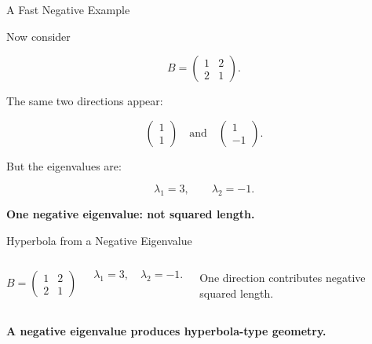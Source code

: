 \documentclass[10pt]{beamer}
\theoremstyle{definition}
\newcommand{\x}[1]{\alert{\textbf{#1}}}
\begin{document}
\begin{frame}{A Fast Negative Example}

Now consider

$$
B=\begin{pmatrix}1&2\\2&1\end{pmatrix}.
$$

\vfill

The same two directions appear:

$$
\begin{pmatrix}1\\1\end{pmatrix}
\quad\text{and}\quad
\begin{pmatrix}1\\-1\end{pmatrix}.
$$

\vfill

But the eigenvalues are:

$$
\lambda_1=3,\qquad \lambda_2=-1.
$$

\vfill

\begin{center}
\x{One negative eigenvalue: not squared length.}
\end{center}

\end{frame}


\begin{frame}[fragile]{Hyperbola from a Negative Eigenvalue}

\begin{columns}

$$
B=\begin{pmatrix}1&2\\2&1\end{pmatrix}
$$

$$
\lambda_1=3,\quad \lambda_2=-1.
$$

\vspace{0.3cm}

One direction contributes negative squared length.

\begin{center}
\end{center}
\end{columns}

\vfill

\begin{center}
\x{A negative eigenvalue produces hyperbola-type geometry.}
\end{center}

\end{frame}
\end{document}
